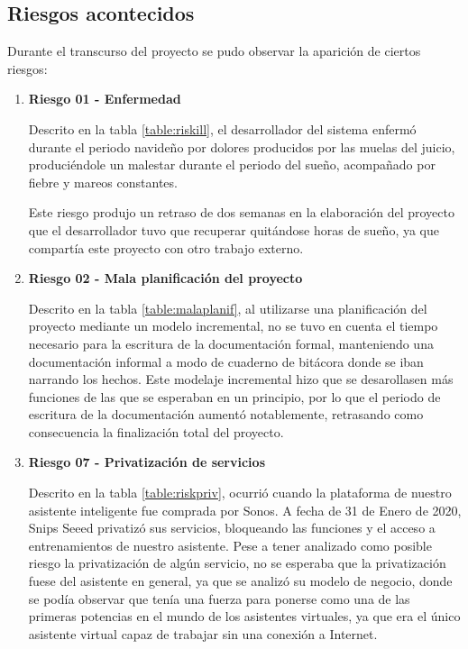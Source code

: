 \newpage
    \subsection{Riesgos acontecidos}
    
        Durante el transcurso del proyecto se pudo observar la aparición de ciertos riesgos:
        
        \begin{enumerate}
        
        \item \textbf{Riesgo 01 - Enfermedad}
        
        Descrito en la tabla \ref{table:riskill}, el desarrollador del sistema enfermó durante el periodo navideño por dolores producidos por las muelas del juicio, produciéndole un malestar durante el periodo del sueño, acompañado por fiebre y mareos constantes.
        
        Este riesgo produjo un retraso de dos semanas en la elaboración del proyecto que el desarrollador tuvo que recuperar quitándose horas de sueño, ya que compartía este proyecto con otro trabajo externo.
        
        \item \textbf{Riesgo 02 - Mala planificación del proyecto}
        
        Descrito en la tabla \ref{table:malaplanif}, al utilizarse una planificación del proyecto mediante un modelo incremental, no se tuvo en cuenta el tiempo necesario para la escritura de la documentación formal, manteniendo una documentación informal a modo de cuaderno de bitácora donde se iban narrando los hechos.
        Este modelaje incremental hizo que se desarollasen más funciones de las que se esperaban en un principio, por lo que el periodo de escritura de la documentación aumentó notablemente, retrasando como consecuencia la finalización total del proyecto.
        
            \item \textbf{Riesgo 07 - Privatización de servicios}
            
        Descrito en la tabla \ref{table:riskpriv}, ocurrió cuando la plataforma de nuestro asistente inteligente fue comprada por Sonos. 
        A fecha de 31 de Enero de 2020, Snips Seeed privatizó sus servicios, bloqueando las funciones y el acceso a entrenamientos de nuestro asistente. Pese a tener analizado como posible riesgo la privatización de algún servicio, no se esperaba que la privatización fuese del asistente en general, ya que se analizó su modelo de negocio, donde se podía observar que tenía una fuerza para ponerse como una de las primeras potencias en el mundo de los asistentes virtuales, ya que era el único asistente virtual capaz de trabajar sin una conexión a Internet. 
        

\end{enumerate}
